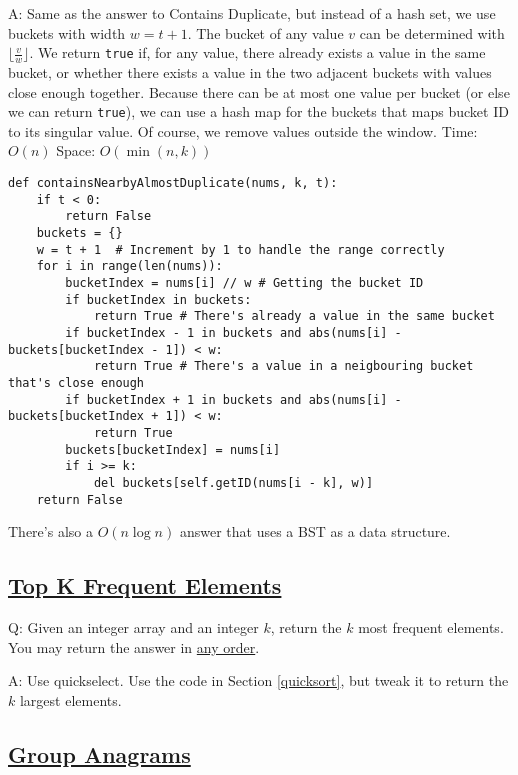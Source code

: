 \documentclass[8pt, table, xcdraw]{article}%
\begin{document}
A: Same as the answer to Contains Duplicate, but instead of a hash set, we use buckets with width $w = t + 1$. The bucket of any value $v$ can be determined with $\lfloor \frac{v}{w} \rfloor$. We return \lstinline{true} if, for any value, there already exists a value in the same bucket, or whether there exists a value in the two adjacent buckets with values close enough together. Because there can be at most one value per bucket (or else we can return \lstinline{true}), we can use a hash map for the buckets that maps bucket ID to its singular value. Of course, we remove values outside the window. Time: $O(n)$ Space: $O(\min(n,k))$

\begin{lstlisting}
def containsNearbyAlmostDuplicate(nums, k, t):
    if t < 0:
        return False
    buckets = {}
    w = t + 1  # Increment by 1 to handle the range correctly
    for i in range(len(nums)):
        bucketIndex = nums[i] // w # Getting the bucket ID
        if bucketIndex in buckets:
            return True # There's already a value in the same bucket
        if bucketIndex - 1 in buckets and abs(nums[i] - buckets[bucketIndex - 1]) < w:
            return True # There's a value in a neigbouring bucket that's close enough
        if bucketIndex + 1 in buckets and abs(nums[i] - buckets[bucketIndex + 1]) < w:
            return True
        buckets[bucketIndex] = nums[i]
        if i >= k:
            del buckets[self.getID(nums[i - k], w)]
    return False
\end{lstlisting}

There's also a $O(n \log n)$ answer that uses a BST as a data structure.

\subsection{\href{https://leetcode.com/problems/top-k-frequent-elements}{Top K Frequent Elements}}

Q: Given an integer array and an integer $k$, return the $k$ most frequent elements. You may return the answer in \underline{any order}.

A: Use quickselect. Use the code in Section \ref{quicksort}, but tweak it to return the $k$ largest elements.

\subsection{\href{https://leetcode.com/problems/group-anagrams}{Group Anagrams}}
\end{document}
